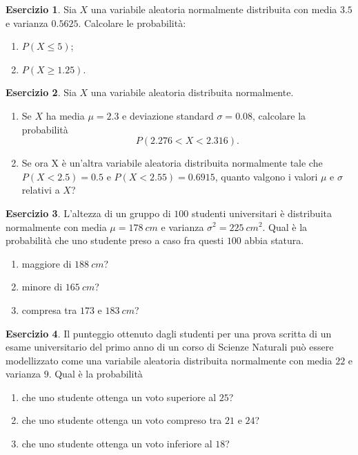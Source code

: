 \documentclass[12pt,a4paper]{article}
\theoremstyle{definition}
\newtheorem{exe}{Esercizio}
\begin{document}
\begin{exe}
	Sia $ X $ una variabile aleatoria normalmente distribuita con media $ 3.5 $ e varianza $ 0.5625 $.
	Calcolare le probabilità:
	\begin{enumerate}
		\item $ P(X \le 5) $;
		\item $ P(X \ge 1.25) $.
	\end{enumerate}
\end{exe}
\begin{exe}
	Sia $ X $ una variabile aleatoria distribuita normalmente.
	\begin{enumerate}
		\item  Se $ X $ ha media $ \mu = 2.3 $ e deviazione standard $ \sigma = 0.08 $, calcolare la probabilità
		      \[ P(2.276 < X < 2.316). \]
		\item  Se ora X è un'altra variabile aleatoria distribuita normalmente tale che $ P (X < 2.5) = 0.5 $ e $ P(X < 2.55) = 0.6915 $, quanto valgono i valori $ \mu $ e $ \sigma $ relativi a $ X $?
	\end{enumerate}
\end{exe}
\begin{exe}
	L'altezza di un gruppo di $ 100 $ studenti universitari è distribuita normalmente con media
	$ \mu = 178\ cm $ e varianza $ \sigma^2 = 225\ cm^2 $. Qual è la probabilità che uno studente preso a caso fra questi $ 100 $ abbia statura.
	\begin{enumerate}
		\item  maggiore di $ 188\ cm $?
		\item  minore di $ 165 \ cm $?
		\item  compresa tra $ 173 $ e $ 183\ cm $?
	\end{enumerate}
\end{exe}
\begin{exe}
	Il punteggio ottenuto dagli studenti per una prova scritta di un esame universitario del
	primo anno di un corso di Scienze Naturali può essere modellizzato come una variabile aleatoria distribuita	normalmente con media $ 22 $ e varianza $ 9 $. Qual è la probabilità
	\begin{enumerate}
		\item  che uno studente ottenga un voto superiore al $ 25 $?
		\item che uno studente ottenga un voto compreso tra $ 21 $ e $ 24 $?
		\item che uno studente ottenga un voto inferiore al $ 18 $?
	\end{enumerate}
\end{exe}
\end{document}
